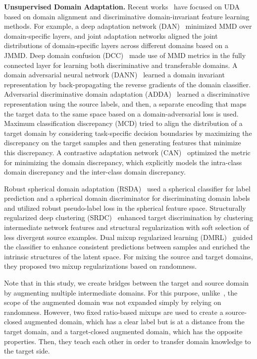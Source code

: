 \documentclass[final]{cvpr}
\begin{document}
\textbf{Unsupervised Domain Adaptation.}
Recent works~\cite{Gopalan2011, SUN2016, Tzeng2017, Long2017, Ganin2015, ADDA2017, Saito2018, Minghao2020} have focused on UDA based on domain alignment and discriminative domain-invariant feature learning methods. 
For example, a deep adaptation network (DAN)~\cite{Long2015} minimized MMD over domain-specific layers, and joint adaptation networks \cite{Long2017} aligned the joint distributions of domain-specific layers across different domains based on a JMMD. Deep domain confusion (DCC)~\cite{Tzeng2017} made use of MMD metrics in the fully connected layer for learning both discriminative and transferable domains.
A domain adversarial neural network (DANN)~\cite{Ganin2015} learned a domain invariant representation by back-propagating the reverse gradients of the domain classifier. Adversarial discriminative domain adaptation (ADDA)~\cite{ADDA2017} learned a discriminative representation using the source labels, and then, a separate encoding that maps the target data to the same space based on a domain-adversarial loss is used. Maximum classification discrepancy (MCD) \cite{MCD2018} tried to align the distribution of a target domain by considering task-specific decision boundaries by maximizing the discrepancy on the target samples and then generating features that minimize this discrepancy. 
A contrastive adaptation network (CAN)~\cite{CAN2019} optimized the metric for minimizing the domain discrepancy, which explicitly models the intra-class domain discrepancy and the inter-class domain discrepancy. 

Robust spherical domain adaptation (RSDA)~\cite{Gu2020} used a spherical classifier for label prediction and a spherical domain discriminator for discriminating domain labels and utilized robust pseudo-label loss in the spherical feature space. Structurally regularized deep clustering (SRDC)~\cite{SRDC} enhanced target discrimination by clustering intermediate network features and structural regularization with soft selection of less divergent source examples. 
Dual mixup regularized learning (DMRL)~\cite{Wu2020} guided the classifier to enhance consistent predictions between samples and enriched the intrinsic structures of the latent space. For mixing the source and target domains, they proposed two mixup regularizations based on randomness. 

Note that in this study, we create bridges between the target and source domain by augmenting multiple intermediate domains. For this purpose, unlike~\cite{Wu2020, Minghao2020}, the scope of the augmented domain was not expanded simply by relying on randomness. However, two fixed ratio-based mixups are used to create a source-closed augmented domain, which has a clear label but is at a distance from the target domain, and a target-closed augmented domain, which has the opposite properties. Then, they teach each other in order to transfer domain knowledge to the target side.
\end{document}
